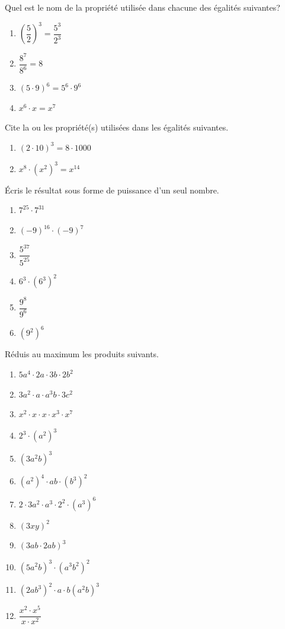 \documentclass[../math2.tex]{subfiles}
\begin{document}
\begin{exercise}
	Quel est le nom de la propriété utilisée dans chacune des égalités suivantes?
	\begin{enumerate} [cols=2]
		\item  $\left(\dfrac{5}{2}\right)^3=\dfrac{5^3}{2^3}$
		\item  $\dfrac{8^7}{8^6}=8$
		\item  $(5\cdot 9)^6=5^6\cdot 9^6$
		\item  $x^6\cdot x=x^7$
	\end{enumerate}
\end{exercise}

\begin{exercise}
	Cite la ou les propriété(s) utilisées dans les égalités suivantes.
	\begin{enumerate}
		\item  $(2\cdot 10)^3=8\cdot 1000$
		\item  $x^8\cdot (x^2)^3=x^{14}$
	\end{enumerate}
\end{exercise}

\begin{exercise}
	Écris le résultat sous forme de puissance d'un seul nombre.
	\begin{enumerate} [cols=3]
		\item  $7^{25}\cdot 7^{31}$
		\item  $(-9)^{16}\cdot (-9)^7$
		\item  $\dfrac{5^{37}}{5^{25}}$
		\item  $6^3\cdot (6^3)^2$
		\item  $\dfrac{9^8}{9^6}$
		\item  $(9^2)^6$
	\end{enumerate}
\end{exercise}

\begin{exercise}
	Réduis au maximum les produits suivants.
	\begin{enumerate}[cols=2]
		\item  $5a^4\cdot 2a\cdot 3b\cdot 2b^2$
		\item  $3a^2\cdot a\cdot a^3b\cdot 3c^2$
		\item  $x^2\cdot x\cdot x\cdot x^3\cdot x^7$
		\item  $2^3\cdot (a^2)^3$
		\item  $(3a^2b)^3$
		\item  $(a^2)^4\cdot ab\cdot (b^3)^2$
		\item  $2\cdot 3a^2\cdot a^3\cdot 2^2\cdot (a^3)^6$
		\item  $(3xy)^2$
		\item  $(3ab\cdot2ab)^3$
		\item  $(5a^2b)^3\cdot (a^3b^2)^2$
		\item  $(2ab^3)^2\cdot a\cdot b(a^2b)^3$
		\item  $\dfrac{x^2\cdot x^5}{x\cdot x^2}$
	\end{enumerate}
\end{exercise}
\end{document}
